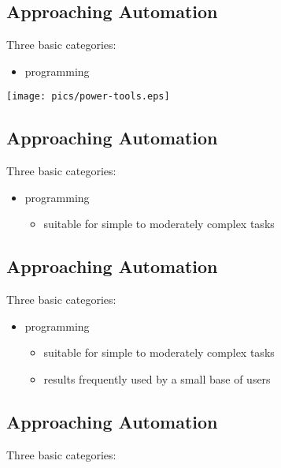 \documentclass[xga]{xdvislides}
\begin{document}
\subsection{Approaching Automation}
Three basic categories:
\\

\begin{itemize}
	\item programming
\end{itemize}
\vspace*{\fill}
\begin{center}
	\texttt{[image: pics/power-tools.eps]}
\end{center}
\vspace*{\fill}



\subsection{Approaching Automation}
Three basic categories:
\\

\begin{itemize}
	\item programming
		\begin{itemize}
			\item suitable for simple to moderately complex tasks
		\end{itemize}
\end{itemize}

\subsection{Approaching Automation}
Three basic categories:
\\

\begin{itemize}
	\item programming
		\begin{itemize}
			\item suitable for simple to moderately complex tasks
			\item results frequently used by a small base of users
		\end{itemize}
\end{itemize}

\subsection{Approaching Automation}
Three basic categories:
\\
\end{document}
